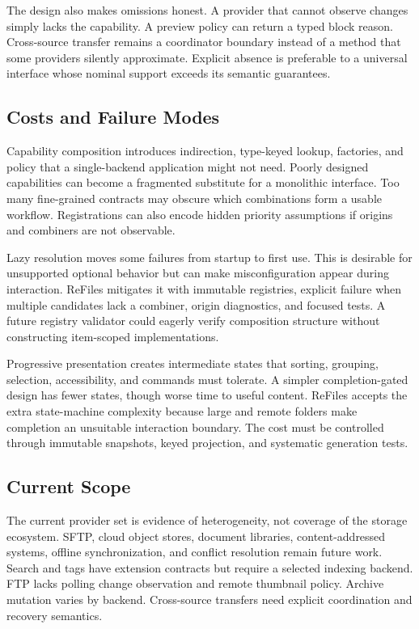 \documentclass[10pt,a4paper,twoside]{article}
\begin{document}
The design also makes omissions honest. A provider that cannot observe changes simply lacks the capability. A
preview policy can return a typed block reason. Cross-source transfer remains a coordinator boundary instead of a
method that some providers silently approximate. Explicit absence is preferable to a universal interface whose
nominal support exceeds its semantic guarantees.

\subsection{Costs and Failure Modes}

Capability composition introduces indirection, type-keyed lookup, factories, and policy that a single-backend
application might not need. Poorly designed capabilities can become a fragmented substitute for a monolithic
interface. Too many fine-grained contracts may obscure which combinations form a usable workflow. Registrations
can also encode hidden priority assumptions if origins and combiners are not observable.

Lazy resolution moves some failures from startup to first use. This is desirable for unsupported optional
behavior but can make misconfiguration appear during interaction. ReFiles mitigates it with immutable registries,
explicit failure when multiple candidates lack a combiner, origin diagnostics, and focused tests. A future
registry validator could eagerly verify composition structure without constructing item-scoped implementations.

Progressive presentation creates intermediate states that sorting, grouping, selection, accessibility, and
commands must tolerate. A simpler completion-gated design has fewer states, though worse time to useful content.
ReFiles accepts the extra state-machine complexity because large and remote folders make completion an unsuitable
interaction boundary. The cost must be controlled through immutable snapshots, keyed projection, and systematic
generation tests.

\subsection{Current Scope}

The current provider set is evidence of heterogeneity, not coverage of the storage ecosystem. SFTP, cloud object
stores, document libraries, content-addressed systems, offline synchronization, and conflict resolution remain
future work. Search and tags have extension contracts but require a selected indexing backend. FTP lacks polling
change observation and remote thumbnail policy. Archive mutation varies by backend. Cross-source transfers need
explicit coordination and recovery semantics.
\end{document}
